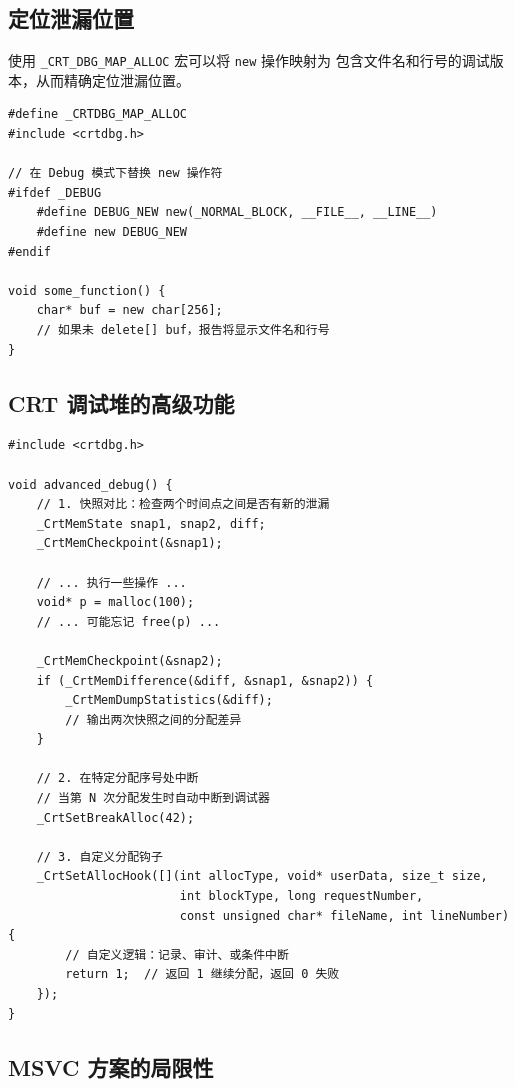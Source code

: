 \documentclass[12pt,a4paper,fontset=fandol]{ctexbook}
\begin{document}
\subsection{定位泄漏位置}

使用 \texttt{\_CRT\_DBG\_MAP\_ALLOC} 宏可以将 \texttt{new} 操作映射为
包含文件名和行号的调试版本，从而精确定位泄漏位置。

\begin{lstlisting}[style=cppstyle, caption={精确定位泄漏位置}]
#define _CRTDBG_MAP_ALLOC
#include <crtdbg.h>

// 在 Debug 模式下替换 new 操作符
#ifdef _DEBUG
    #define DEBUG_NEW new(_NORMAL_BLOCK, __FILE__, __LINE__)
    #define new DEBUG_NEW
#endif

void some_function() {
    char* buf = new char[256];
    // 如果未 delete[] buf，报告将显示文件名和行号
}
\end{lstlisting}

\subsection{CRT 调试堆的高级功能}

\begin{lstlisting}[style=cppstyle, caption={CRT 调试堆高级用法}]
#include <crtdbg.h>

void advanced_debug() {
    // 1. 快照对比：检查两个时间点之间是否有新的泄漏
    _CrtMemState snap1, snap2, diff;
    _CrtMemCheckpoint(&snap1);

    // ... 执行一些操作 ...
    void* p = malloc(100);
    // ... 可能忘记 free(p) ...

    _CrtMemCheckpoint(&snap2);
    if (_CrtMemDifference(&diff, &snap1, &snap2)) {
        _CrtMemDumpStatistics(&diff);
        // 输出两次快照之间的分配差异
    }

    // 2. 在特定分配序号处中断
    // 当第 N 次分配发生时自动中断到调试器
    _CrtSetBreakAlloc(42);

    // 3. 自定义分配钩子
    _CrtSetAllocHook([](int allocType, void* userData, size_t size,
                        int blockType, long requestNumber,
                        const unsigned char* fileName, int lineNumber) {
        // 自定义逻辑：记录、审计、或条件中断
        return 1;  // 返回 1 继续分配，返回 0 失败
    });
}
\end{lstlisting}

\subsection{MSVC 方案的局限性}
\end{document}
